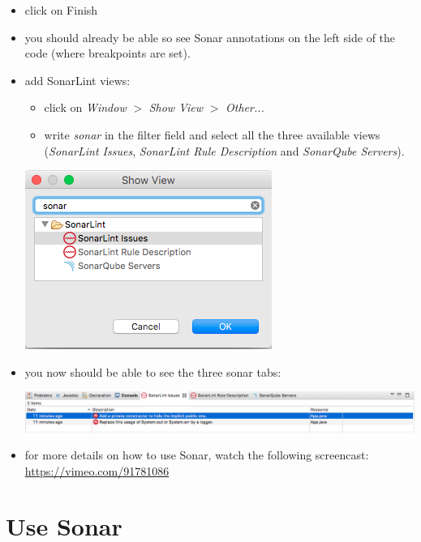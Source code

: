 \documentclass{article}
\newif\ifinstall
\begin{document}
\begin{itemize}
\item click on Finish
\item you should already be able so see Sonar annotations on the left side of the code (where breakpoints are set).
\item add SonarLint views:
\begin{itemize}
	\item click on \textit{Window} $ > $ \textit{Show View} $ > $ \textit{Other...} 
	\item write \textit{sonar} in the filter field and select all the three available views (\textit{SonarLint Issues}, \textit{SonarLint Rule Description} and \textit{SonarQube Servers}).
\end{itemize}
\begin{center}
	\includegraphics[scale=0.5]{figures/ss9.png}
\end{center}
\item you now should be able to see the three sonar tabs:
\begin{center}
\includegraphics[width=0.9\linewidth]{figures/ss10.png}
\end{center}
\item for more details on how to use Sonar, watch the following
  screencast: \url{https://vimeo.com/91781086}
\end{itemize}

\ifinstall
\else

\section{Use Sonar}
\end{document}
